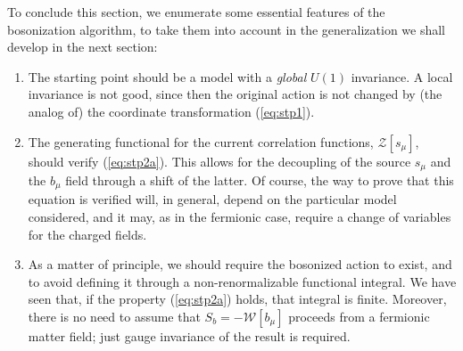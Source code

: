 \documentclass[a4paper,12pt]{article}
\begin{document}
To conclude this section, we enumerate some essential features of the
bosonization algorithm, to take them into account in the
generalization we shall develop in the next section:
\begin{enumerate}

\item The starting point should be a model with a {\em global\/}
  $U(1)$ invariance. A local invariance is not good, since then the
  original action is not changed by (the analog of) the coordinate
  transformation (\ref{eq:stp1}).
\item The generating functional for the current correlation functions,
  ${\mathcal Z}[s_\mu]$, should verify (\ref{eq:stp2a}). This allows for
  the decoupling of the source $s_\mu$ and the $b_\mu$ field through a
  shift of the latter. Of course, the way to prove that this equation
  is verified will, in general, depend on the particular model
  considered, and it may, as in the fermionic case, require a change
  of variables for the charged fields.
\item As a matter of principle, we should require the bosonized action
  to exist, and to avoid defining it through a non-renormalizable
  functional integral. We have seen that, if the property
  (\ref{eq:stp2a}) holds, that integral is finite. Moreover, there is
  no need to assume that $ S_b=- {\mathcal W}[b_\mu] $ proceeds from a
  fermionic matter field; just gauge invariance of the result is
  required.
\end{enumerate}
\end{document}

